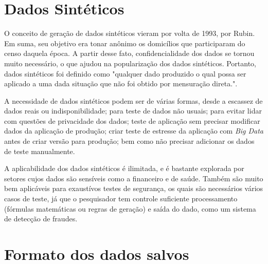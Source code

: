 \documentclass[
	12pt,				%
	openright,			%
	twoside,			%
	a4paper,			%
	english,			%
	brazil				%
	]{abntex2}
\begin{document}
	\section{Dados Sintéticos}
	O conceito de geração de dados sintéticos vieram por volta de 1993, por Rubin. \cite{rubin1993statistical}
	Em suma, seu objetivo era tonar anônimo os domicílios que participaram do censo daquela época.
	A partir desse fato, confidencialidade dos dados se tornou muito necessário, o que ajudou na popularização dos dados sintéticos.
	Portanto, dados sintéticos foi definido como "qualquer dado produzido o qual possa ser aplicado a uma dada situação que não foi obtido por mensuração direta.". \cite{mcgraw-hilleducation2016}
	\par
	A necessidade de dados sintéticos podem ser de várias formas, 
	desde a escassez de dados reais ou indisponibilidade;
	 para teste de dados não usuais;
	 para evitar lidar com questões de privacidade dos dados;
	 teste de aplicação sem precisar modificar dados da aplicação de produção;
	 criar teste de estresse da aplicação com \emph{Big Data} antes de criar versão para produção;
	 bem como não precisar adicionar os dados de teste manualmente. \cite{top15DatagenTools2019}
	\par
	A aplicabilidade dos dados sintéticos é ilimitada, e é bastante explorada por setores cujos dados são sensíveis como a financeiro \cite{lopez2012money} e de saúde. \cite{bergeat2014french} 	
	Também são muito bem aplicáveis para exaustívos testes de segurança, os quais são necessários vários casos de teste, já que o pesquisador tem controle suficiente processamento (fórmulas matemáticas ou regras de geração) e saída do dado, como um sistema de detecção de fraudes. \cite{barse2003synthesizing}
	
	\section{Formato dos dados salvos}
\end{document}
